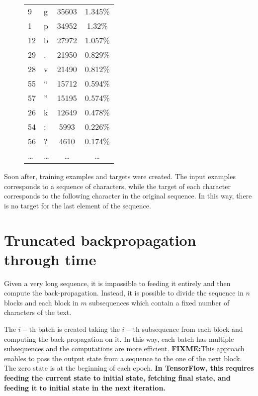 \documentclass[a4paper,12pt]{article} %
\begin{document}
\begin{figure}[htb]
\begin{tabular}{llcc}
		9        &         g &               35603 &             1.345\% \\
		1        &         p &               34952 &              1.32\% \\
		12       &         b &               27972 &             1.057\% \\
		29       &         . &               21950 &             0.829\% \\
		28       &         v &               21490 &             0.812\% \\
		55       &         “ &               15712 &             0.594\% \\
		57       &         ” &               15195 &             0.574\% \\
		26       &         k &               12649 &             0.478\% \\
		54       &         ; &                5993 &             0.226\% \\
		56       &         ? &                4610 &             0.174\% \\
		\dots       &         \dots &                \dots &             \dots 
		\\
		\bottomrule
	\end{tabular}
	\label{tab:statistics}
	\end{figure}

	\bigskip
	Soon after, training examples and targets were created. The input examples 
	corresponds to a sequence of characters, while the target of each character 
	corresponds to the following character in the original sequence. In this 
	way, there is no target for the last element of the sequence.
	
	\section{Truncated backpropagation through time}
	\label{section:backpropagation}
	
	Given a very long sequence, it is impossible to feeding it entirely and 
	then compute the back-propagation. Instead, it is possible to divide the 
	sequence in $n$ blocks and each block in $m$ subsequences which contain a 
	fixed number of characters of the text.\bigskip
	
	The $i-\mathrm{th}$ batch is created taking the $i-\mathrm{th}$ subsequence 
	from each block and computing the back-propagation on it. In this way, each 
	batch has multiple subsequences and the computations are more efficient.
	\textbf{FIXME:}This approach enables to pass the output state from a 
	sequence to the one of the next block. The zero state is at the beginning 
	of each epoch. \textbf{In TensorFlow, this requires feeding the current 
	state to initial state, fetching final state, and feeding it to initial 
	state in the next iteration.}\bigskip
	
\end{document}
